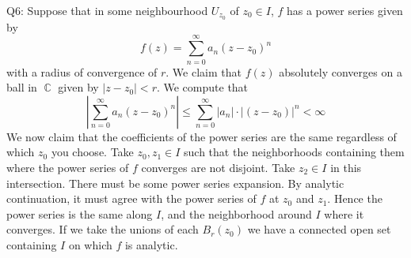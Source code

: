 \documentclass[letterpaper]{article}
\DeclareMathOperator{\C}{\mathbb{C}}
\begin{document}
\noindent Q6:
Suppose that in some neighbourhood $U_{z_0}$ of $z_0\in I$, $f$ has a power series given by $$f(z) = \sum_{n=0}^\infty a_n (z-z_0)^n$$ with a radius of convergence of $r$. We claim that $f(z)$ absolutely converges on a ball in $\C$ given by $|z-z_0|<r$. 
We compute that $$|\sum_{n=0}^\infty a_n (z-z_0)^n| \leq \sum_{n=0}^\infty |a_n|\cdot |(z-z_0)|^n < \infty$$
We now claim that the coefficients of the power series are the same regardless of which $z_0$ you choose. Take $z_0,z_1 \in I$ such that the neighborhoods containing them where the power series of $f$ converges are not disjoint. Take $z_2\in I$ in this intersection. There must be some power series expansion. By analytic continuation, it must agree with the power series of $f$ at $z_0$ and $z_1$. Hence the power series is the same along $I$, and the neighborhood around $I$ where it converges. If we take the unions of each $B_{r}(z_0)$ we have a connected open set containing $I$ on which $f$ is analytic. 
\end{document}
